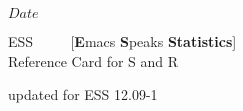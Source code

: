 \documentclass[a4paper]{article}
\begin{document}
\SVN $Date$
\begin{center}
  {\LARGE ESS \ \ \ \ {\large
      [\textbf{E}macs \textbf{S}peaks \textbf{Statistics}]}
      \\[.5ex] Reference Card for S and R}

  \smallskip

  {\small updated for ESS 12.09-1}%
  \\[1ex] {\tiny \SVNDate}
\end{center}
\end{document}
